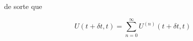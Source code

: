 de sorte que 

\begin{equation}
    U(t+\delta t, t) = \sum_{n=0}^{\infty}U^{(n)}(t+\delta t, t)
\end{equation}










